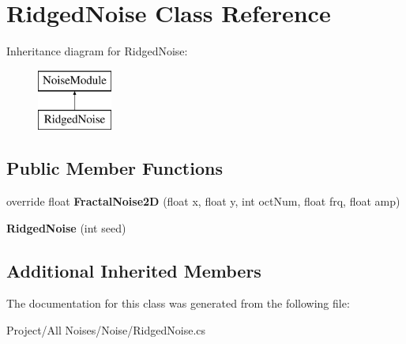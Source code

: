 \hypertarget{class_ridged_noise}{}\section{Ridged\+Noise Class Reference}
\label{class_ridged_noise}
Inheritance diagram for Ridged\+Noise\+:\begin{figure}[H]
\begin{center}
\leavevmode
\includegraphics[height=2.000000cm]{class_ridged_noise}
\end{center}
\end{figure}
\subsection*{Public Member Functions}
\begin{DoxyCompactItemize}
\item 
\mbox{\label{class_ridged_noise_ae7d0d5d2eecc5305930c8d2f166d39f7}} 
override float {\bfseries Fractal\+Noise2D} (float x, float y, int oct\+Num, float frq, float amp)
\item 
\mbox{\label{class_ridged_noise_afd86e70bc7f353a07ca8d2c58c94578d}} 
{\bfseries Ridged\+Noise} (int seed)
\end{DoxyCompactItemize}
\subsection*{Additional Inherited Members}


The documentation for this class was generated from the following file\+:\begin{DoxyCompactItemize}
\item 
Project/\+All Noises/\+Noise/Ridged\+Noise.\+cs\end{DoxyCompactItemize}
